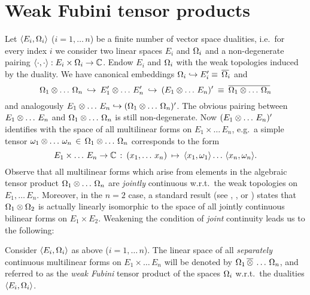 
\chapter{Weak Fubini tensor products}   \label{app:fubini}

Let $\langle E_i,\Omega_i \rangle$ ($i=1,\ldots\, n$) be a finite number of
vector space dualities, i.e.\ for every index $i$ we consider two
linear spaces $E_i$ and $\Omega_i$ and a non-degenerate pairing
$\langle\cdot, \cdot\rangle : E_i \times \Omega_i \rightarrow \mathbb{C}$\@.
Endow $E_i$ and $\Omega_i$ with the weak topologies induced by the duality.
We have canonical embeddings
$\Omega_i \hookrightarrow E_i'\equiv\, \overline{\Omega_i\!}\,$
and
$$ \Omega_1 \otimes \ldots\, \Omega_n \:\hookrightarrow\:
   E_1'\otimes \ldots\, E_n' \:\hookrightarrow\: (E_1\otimes \ldots\, E_n)'
   \:\equiv\:  \overline{\Omega_1 \otimes \ldots\, \Omega_n\!}\, $$
and analogously
$E_1\otimes \ldots\, E_n  \hookrightarrow  (\Omega_1 \otimes \ldots\, \Omega_n)'$.
The obvious pairing between $E_1\otimes \ldots\, E_n$ and $\Omega_1 \otimes \ldots\, \Omega_n$
is still non-degenerate.
Now $(E_1\otimes \ldots\, E_n)'$ identifies with the space of all multilinear forms on
$E_1 \times \ldots\, E_n$, e.g.\ a simple tensor
$\omega_1 \otimes \ldots\, \omega_n \,\in\, \Omega_1 \otimes \ldots\, \Omega_n$
corresponds to the form
$$ E_1 \times \ldots\, E_n \rightarrow \mathbb{C} \,: \:
   (x_1, \ldots\, x_n) \:\mapsto\: \langle x_1,\omega_1 \rangle \ldots\, \langle x_n,\omega_n \rangle. $$
Observe that all multilinear forms which arise from elements in the algebraic
tensor product $\Omega_1 \otimes \ldots\, \Omega_n$ are {\em jointly\/} continuous
w.r.t.\ the weak topologies on $E_1, \ldots\, E_n$\@. Moreover, in the $n=2$ case,
a standard result
(see \cite[\S 42.4]{Treves}, \cite[\S II.41.3.10]{Kothe}, or \cite[\S 15.3.6]{Jarchow})
states that $\Omega_1 \otimes \Omega_2$ is actually linearly isomorphic to the space of all
jointly continuous bilinear forms on $E_1 \times E_2$\@.
Weakening the condition of {\em joint\/} continuity leads us to the following:

\begin{defn_chp} \label{def:weak_fubini_tensor}
  Consider $\langle E_i,\Omega_i \rangle$ as above ($i=1,\ldots\, n$).
  The linear space of all {\em separately\/} continuous multilinear forms on
  $E_1 \times \ldots\, E_n$ will be denoted by $\Omega_1 \,\overline{\otimes}\: \ldots\, \Omega_n$,
  and referred to as the {\em weak Fubini\/} tensor product of the spaces
  $\Omega_i$ w.r.t.\ the dualities $\langle E_i,\Omega_i \rangle$.
\end{defn_chp}


